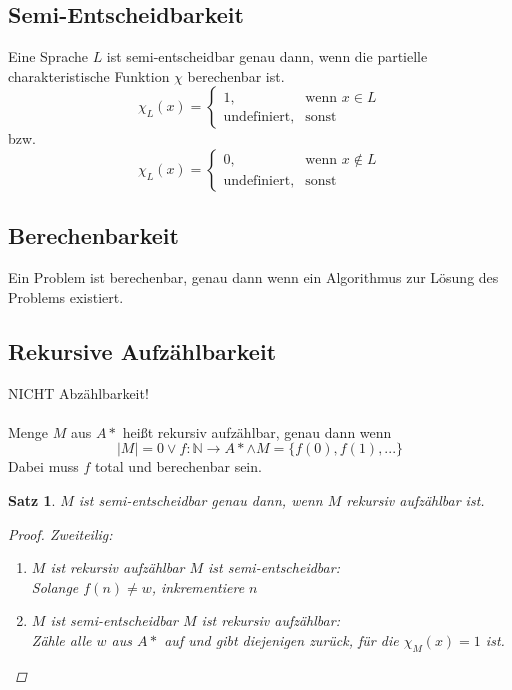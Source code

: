 \documentclass{article}
\begin{document}
\subsection{Semi-Entscheidbarkeit}
Eine Sprache $L$ ist semi-entscheidbar genau dann, wenn die partielle charakteristische Funktion $\chi$ berechenbar ist.
\begin{equation}
    \chi _L(x)=
    \begin{cases}
        1,                  & \text{wenn } x\in L \\
        \text{undefiniert}, & \text{sonst}
    \end{cases}
\end{equation}
bzw.
\begin{equation}
    \chi _L(x)=
    \begin{cases}
        0,                  & \text{wenn } x\not\in L \\
        \text{undefiniert}, & \text{sonst}
    \end{cases}
\end{equation}
\subsection{Berechenbarkeit}
Ein Problem ist berechenbar, genau dann wenn ein Algorithmus zur Lösung des Problems existiert.
\subsection{Rekursive Aufzählbarkeit}
\Rightarrow NICHT Abzählbarkeit!\\\\
Menge $M$ aus $A*$ heißt rekursiv aufzählbar, genau dann wenn
\begin{equation}
    |M|=0 \vee f:\mathbb{N}\rightarrow A* \wedge M=\{f(0), f(1),...\}
\end{equation}
Dabei muss $f$ total und berechenbar sein.\\
\newtheorem*{RaSe}{Satz}
\begin{framed}
    \begin{RaSe}
        $M$ ist semi-entscheidbar genau dann, wenn $M$ rekursiv aufzählbar ist.
        \begin{proof}
            Zweiteilig:
            \begin{enumerate}
                \item $M$ ist rekursiv aufzählbar \Rightarrow $M$ ist semi-entscheidbar:\\
                      Solange $f(n) \not= w$, inkrementiere $n$
                \item $M$ ist semi-entscheidbar \Rightarrow $M$ ist rekursiv aufzählbar:\\
                      Zähle alle $w$ aus $A*$ auf und gibt diejenigen zurück, für die $\chi_M(x) = 1$ ist.
                      \qedhere
            \end{enumerate}
        \end{proof}
    \end{RaSe}
\end{framed}
\end{document}
